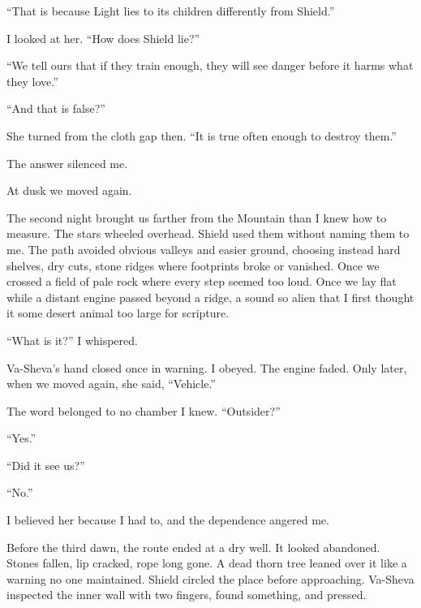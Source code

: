 ``That is because Light lies to its children differently from Shield.''\par

I looked at her. ``How does Shield lie?''\par

``We tell ours that if they train enough, they will see danger before it harms what they love.''\par

``And that is false?''\par

She turned from the cloth gap then. ``It is true often enough to destroy them.''\par

The answer silenced me.\par

At dusk we moved again.\par

The second night brought us farther from the Mountain than I knew how to measure. The stars wheeled overhead. Shield used them without naming them to me. The path avoided obvious valleys and easier ground, choosing instead hard shelves, dry cuts, stone ridges where footprints broke or vanished. Once we crossed a field of pale rock where every step seemed too loud. Once we lay flat while a distant engine passed beyond a ridge, a sound so alien that I first thought it some desert animal too large for scripture.\par

``What is it?'' I whispered.\par

Va-Sheva's hand closed once in warning. I obeyed. The engine faded. Only later, when we moved again, she said, ``Vehicle.''\par

The word belonged to no chamber I knew. ``Outsider?''\par

``Yes.''\par

``Did it see us?''\par

``No.''\par

I believed her because I had to, and the dependence angered me.\par

Before the third dawn, the route ended at a dry well. It looked abandoned. Stones fallen, lip cracked, rope long gone. A dead thorn tree leaned over it like a warning no one maintained. Shield circled the place before approaching. Va-Sheva inspected the inner wall with two fingers, found something, and pressed.\par

